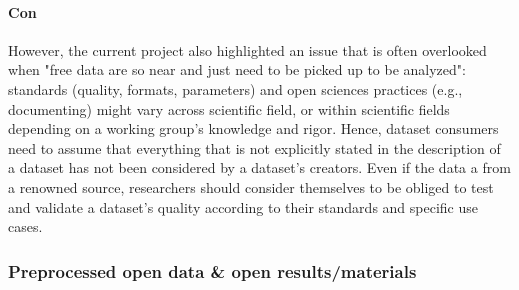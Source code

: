 \paragraph{Con}
%
However, the current project also highlighted an issue that is often overlooked
when "free data are so near and just need to be picked up to be analyzed":
%
standards (quality, formats, parameters) and open sciences practices (e.g.,
documenting) might vary across scientific field, or within scientific fields
depending on a working group's knowledge and rigor.
Hence, dataset consumers need to assume that everything that is not explicitly
stated in the description of a dataset has not been considered by a dataset's
creators.
Even if the data a from a renowned source, researchers should consider
themselves to be obliged to test and validate a dataset's quality according to
their standards and specific use cases.


\subsubsection{Preprocessed open data \& open results/materials}






